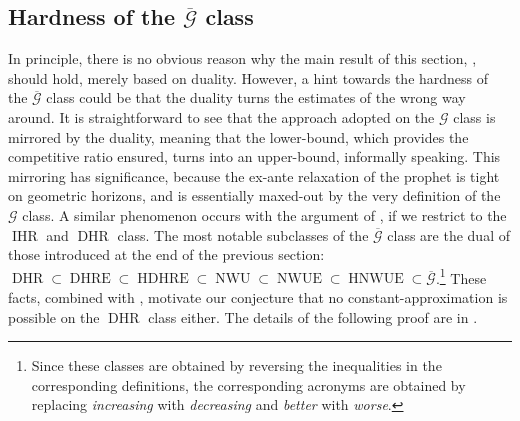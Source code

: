 \documentclass[11pt, a4paper, twoside]{article}
\newcommand{\PGF}{\mathcal{G}}
\newcommand{\PGFd}{\overline{\mathcal{G}}}
\DeclareMathOperator{\IHR}{IHR}
\DeclareMathOperator{\DHR}{DHR}
\DeclareMathOperator{\DHRE}{DHRE}
\DeclareMathOperator{\HDHRE}{HDHRE}
\DeclareMathOperator{\NWU}{NWU}
\DeclareMathOperator{\NWUE}{NWUE}
\DeclareMathOperator{\HNWUE}{HNWUE}
\numberwithin{equation}{section}
\begin{document}
	\subsection{Hardness of the $\PGFd$ class}\label{Gdclass}
	In principle, there is no obvious reason why the main result of this section, , should hold, merely based on duality. However, a hint towards the hardness of the $\PGFd$ class could be that the duality turns the estimates of  the wrong way around. It is straightforward to see that the approach adopted on the $\PGF$ class is mirrored by the duality, meaning that the lower-bound, which provides the competitive ratio ensured, turns into an upper-bound, informally speaking. This mirroring has significance, because the ex-ante relaxation of the prophet is tight on geometric horizons, and is essentially maxed-out by the very definition of the $\PGF$ class. A similar phenomenon occurs with the argument of \cite{AliBanGolMunWan20}, if we restrict to the $\IHR$ and $\DHR$ class. The most notable subclasses of the $\PGFd$ class are the dual of those introduced at the end of the previous section: $\DHR\subset\DHRE\subset\HDHRE\subset\NWU\subset\NWUE\subset\HNWUE\subset\PGFd$.\footnote{Since these classes are obtained by reversing the inequalities in the corresponding definitions, the corresponding acronyms are obtained by replacing \textit{increasing} with \textit{decreasing} and \textit{better} with \textit{worse}.} These facts, combined with , motivate our conjecture that no constant-approximation is possible on the $\DHR$ class either. The details of the following proof are in .
	
\end{document}
